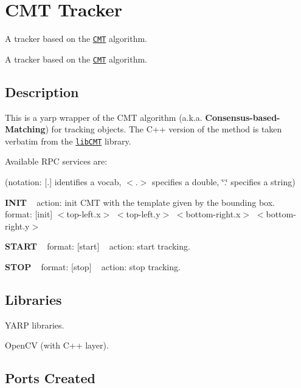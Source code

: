 \section{C\+M\+T Tracker}
\label{group__icub__cmt}


A tracker based on the \href{http://www.gnebehay.com/cmt}{\tt C\+M\+T} algorithm.  


A tracker based on the \href{http://www.gnebehay.com/cmt}{\tt C\+M\+T} algorithm. 

\hypertarget{group__icub__tld_intro_sec}{}\subsection{Description}\label{group__icub__tld_intro_sec}
This is a yarp wrapper of the C\+M\+T algorithm (a.\+k.\+a. {\bfseries Consensus-\/based-\/\+Matching}) for tracking objects. The C++ version of the method is taken verbatim from the \href{https://github.com/delmottea/libCMT}{\tt lib\+C\+M\+T} library.

Available R\+P\+C services are\+:

(notation\+: \mbox{[}.\mbox{]} identifies a vocab, $<$.$>$ specifies a double, \char`\"{}.\char`\"{} specifies a string)

{\bfseries I\+N\+I\+T} ~\newline
action\+: init C\+M\+T with the template given by the bounding box. ~\newline
format\+: \mbox{[}init\mbox{]} $<$top-\/left.\+x$>$ $<$top-\/left.\+y$>$ $<$bottom-\/right.\+x$>$ $<$bottom-\/right.\+y$>$ ~\newline


{\bfseries S\+T\+A\+R\+T} ~\newline
format\+: \mbox{[}start\mbox{]} ~\newline
 action\+: start tracking.

{\bfseries S\+T\+O\+P} ~\newline
format\+: \mbox{[}stop\mbox{]} ~\newline
 action\+: stop tracking.\hypertarget{group__icub__tld_lib_sec}{}\subsection{Libraries}\label{group__icub__tld_lib_sec}

\begin{DoxyItemize}
\item Y\+A\+R\+P libraries.
\item Open\+C\+V (with C++ layer).
\end{DoxyItemize}\hypertarget{group__icub__tld_portsc_sec}{}\subsection{Ports Created}\label{group__icub__tld_portsc_sec}

